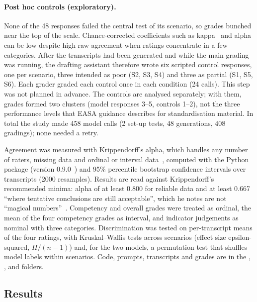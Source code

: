 \documentclass[11pt]{article}
\begin{document}
\paragraph{Post hoc controls (exploratory).} None of the 48 responses failed the central test of its scenario, so grades bunched near the top of the scale. Chance-corrected coefficients such as kappa~\cite{feinstein1990} and alpha~\cite{krippendorff2004} can be low despite high raw agreement when ratings concentrate in a few categories. After the transcripts had been generated and while the main grading was running, the drafting assistant therefore wrote six scripted control responses, one per scenario, three intended as poor (S2, S3, S4) and three as partial (S1, S5, S6). Each grader graded each control once in each condition (24 calls). This step was not planned in advance. The controls are analysed separately; with them, grades formed two clusters (model responses 3--5, controls 1--2), not the three performance levels that EASA guidance describes for standardisation material. In total the study made 458 model calls (2 set-up tests, 48 generations, 408 gradings); none needed a retry.

Agreement was measured with Krippendorff's alpha, which handles any number of raters, missing data and ordinal or interval data~\cite{krippendorff2011}, computed with the  Python package (version 0.9.0~\cite{castro2026}) and 95\% percentile bootstrap confidence intervals over transcripts (\num{2000} resamples). Results are read against Krippendorff's recommended minima: alpha of at least 0.800 for reliable data and at least 0.667 ``where tentative conclusions are still acceptable'', which he notes are not ``magical numbers''~\cite[``Recommendations'']{krippendorff2004}. Competency and overall grades were treated as ordinal, the mean of the four competency grades as interval, and indicator judgements as nominal with three categories. Discrimination was tested on per-transcript means of the four ratings, with Kruskal--Wallis tests across scenarios (effect size epsilon-squared, $H/(n-1)$) and, for the two models, a permutation test that shuffles model labels within scenarios. Code, prompts, transcripts and grades are in the , ,  and  folders.

\subsection{Results}\label{sec:results}
\end{document}
